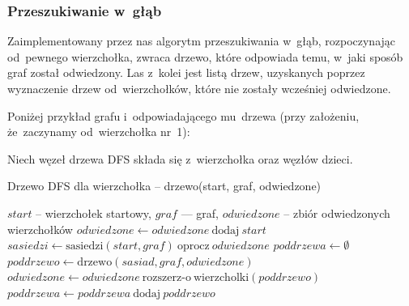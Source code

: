 \documentclass[a4paper,12pt]{mwart}
\begin{document}
\subsubsection{Przeszukiwanie w~głąb}
\label{sec:dfs-tree}

Zaimplementowany przez nas algorytm przeszukiwania w~głąb, rozpoczynając
od~pewnego wierzchołka, zwraca drzewo, które odpowiada temu, w~jaki sposób graf
został odwiedzony. Las z~kolei jest listą drzew, uzyskanych poprzez wyznaczenie
drzew od~wierzchołków, które nie zostały wcześniej odwiedzone.

Poniżej przykład grafu i~odpowiadającego mu~drzewa (przy założeniu,
że~zaczynamy od~wierzchołka nr~1):

\begin{figure}[H]
  \centering
\end{figure}

Niech węzeł drzewa DFS składa się z~wierzchołka oraz węzłów dzieci.

\begin{algorithm}[H]
\caption{Drzewo DFS dla wierzchołka -- drzewo(start, graf, odwiedzone)}
\begin{algorithmic}[1]
\Require $start$ -- wierzchołek startowy, $graf$ --- graf, $odwiedzone$ -- zbiór odwiedzonych wierzchołków
\State {}
\Else
\State $odwiedzone \gets odwiedzone \ \text{dodaj} \ start$
\State $sasiedzi \gets \text{sasiedzi}(start, graf) \ \text{oprocz} \ odwiedzone$ \label{alg:dfs-tree:sasiedzi}
\State $poddrzewa \gets \emptyset$
\State $poddrzewo \gets \text{drzewo}(sasiad, graf, odwiedzone)$ 
\State $odwiedzone \gets odwiedzone \ \text{rozszerz-o} \ \text{wierzcholki}(poddrzewo)$ \label{alg:dfs-tree:wierzcholki}
\State $poddrzewa \gets poddrzewa \ \text{dodaj} \ poddrzewo$
\EndFor
\State {}
\EndIf
\end{algorithmic}
\end{algorithm}
\end{document}
